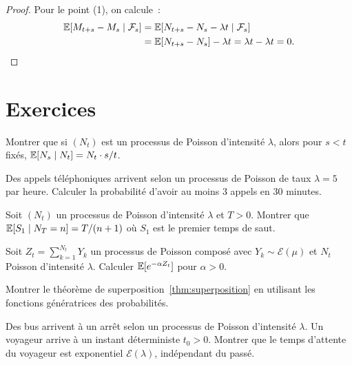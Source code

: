\begin{proof}
Pour le point (1), on calcule~:
\begin{align*}
  \mathbb{E}[M_{t+s} - M_s \mid \mathcal{F}_s]
  &= \mathbb{E}[N_{t+s} - N_s - \lambda t \mid \mathcal{F}_s] \\
  &= \mathbb{E}[N_{t+s} - N_s] - \lambda t = \lambda t - \lambda t = 0.
\end{align*}
\end{proof}

\section{Exercices}

\begin{exercice}
Montrer que si $(N_t)$ est un processus de Poisson d'intensit\'e $\lambda$, alors
pour $s < t$ fix\'es, $\mathbb{E}[N_s \mid N_t] = N_t \cdot s/t$.
\end{exercice}

\begin{exercice}
Des appels t\'el\'ephoniques arrivent selon un processus de Poisson de taux
$\lambda = 5$ par heure. Calculer la probabilit\'e d'avoir au moins $3$ appels
en $30$ minutes.
\end{exercice}

\begin{exercice}
Soit $(N_t)$ un processus de Poisson d'intensit\'e $\lambda$ et $T > 0$.
Montrer que $\mathbb{E}[S_1 \mid N_T = n] = T/(n+1)$ o\`u $S_1$ est le premier temps de saut.
\end{exercice}

\begin{exercice}
Soit $Z_t = \sum_{k=1}^{N_t} Y_k$ un processus de Poisson compos\'e avec
$Y_k \sim \mathcal{E}(\mu)$ et $N_t$ Poisson d'intensit\'e $\lambda$.
Calculer $\mathbb{E}[e^{-\alpha Z_t}]$ pour $\alpha > 0$.
\end{exercice}

\begin{exercice}
Montrer le th\'eor\`eme de superposition~\ref{thm:superposition} en utilisant
les fonctions g\'en\'eratrices des probabilit\'es.
\end{exercice}

\begin{exercice}
Des bus arrivent \`a un arr\^et selon un processus de Poisson d'intensit\'e $\lambda$.
Un voyageur arrive \`a un instant d\'eterministe $t_0 > 0$. Montrer que le temps
d'attente du voyageur est exponentiel $\mathcal{E}(\lambda)$, ind\'ependant du
pass\'e.
\end{exercice}
